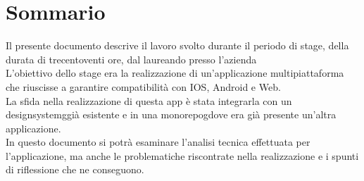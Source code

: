 \cleardoublepage
{}
{}
\begingroup
\let\clearpage\relax
\let\cleardoublepage\relax
\chapter*{Sommario}

Il presente documento descrive il lavoro svolto durante il periodo di stage, della durata di trecentoventi ore, dal laureando \myName presso l'azienda \myAzienda
\\L'obiettivo dello stage era la realizzazione di un'applicazione multipiattaforma che riuscisse a garantire compatibilità con IOS, Android e Web.
\\La sfida nella realizzazione di questa app è stata integrarla con un \gls{designsystemg}\glox già esistente e in una \gls{monorepog}\glox dove era già presente un'altra applicazione.
\\In questo documento si potrà esaminare l'analisi tecnica effettuata per l'applicazione, ma anche le problematiche riscontrate nella realizzazione e i spunti di riflessione che ne conseguono.

\endgroup
\vfill
